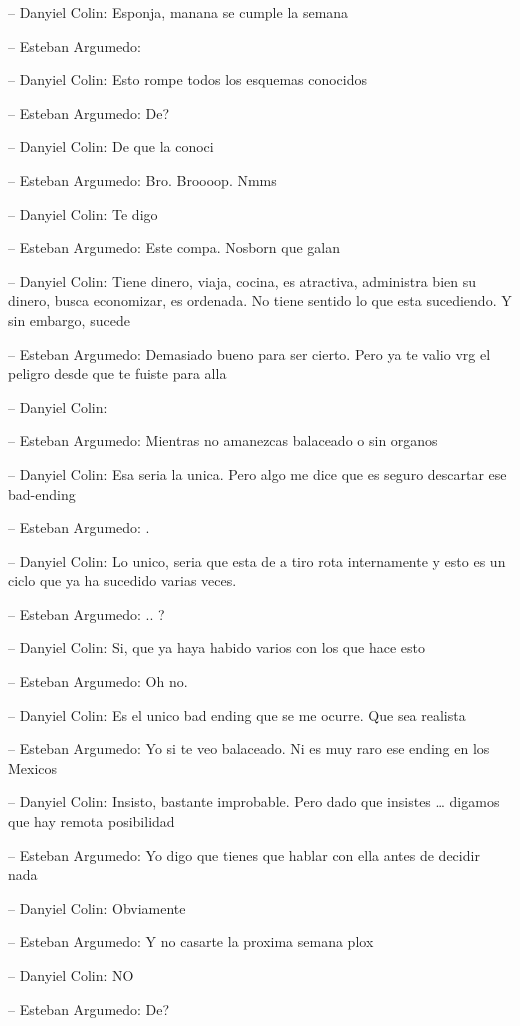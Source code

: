 -- Danyiel Colin: Esponja, manana se cumple la semana

-- Esteban Argumedo:

-- Danyiel Colin: Esto rompe todos los esquemas conocidos

-- Esteban Argumedo: De?

-- Danyiel Colin: De que la conoci

-- Esteban Argumedo: Bro. Broooop. Nmms

-- Danyiel Colin: Te digo

-- Esteban Argumedo: Este compa. Nosborn que galan

-- Danyiel Colin: Tiene dinero, viaja, cocina, es atractiva, administra
bien su dinero, busca economizar, es ordenada. No tiene sentido lo que
esta sucediendo. Y sin embargo, sucede

-- Esteban Argumedo: Demasiado bueno para ser cierto. Pero ya te valio
vrg el peligro desde que te fuiste para alla

-- Danyiel Colin:

-- Esteban Argumedo: Mientras no amanezcas balaceado o sin organos

-- Danyiel Colin: Esa seria la unica. Pero algo me dice que es seguro
descartar ese bad-ending

-- Esteban Argumedo: .

-- Danyiel Colin: Lo unico, seria que esta de a tiro rota internamente y
esto es un ciclo que ya ha sucedido varias veces.

-- Esteban Argumedo: .. ?

-- Danyiel Colin: Si, que ya haya habido varios con los que hace esto

-- Esteban Argumedo: Oh no.

-- Danyiel Colin: Es el unico bad ending que se me ocurre. Que sea
realista

-- Esteban Argumedo: Yo si te veo balaceado. Ni es muy raro ese ending
en los Mexicos

-- Danyiel Colin: Insisto, bastante improbable. Pero dado que insistes
\ldots{} digamos que hay remota posibilidad

-- Esteban Argumedo: Yo digo que tienes que hablar con ella antes de
decidir nada

-- Danyiel Colin: Obviamente

-- Esteban Argumedo: Y no casarte la proxima semana plox

-- Danyiel Colin: NO

-- Esteban Argumedo: De?

